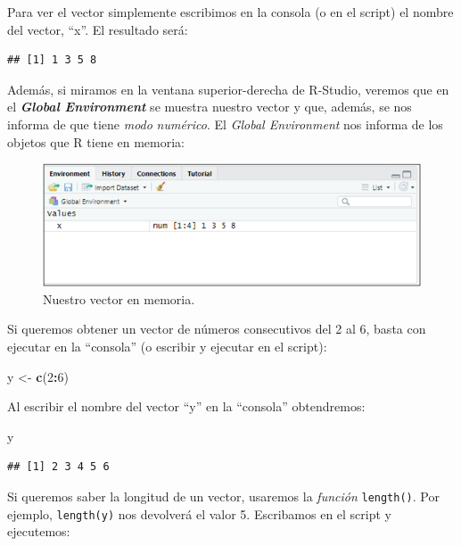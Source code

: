 \documentclass[
]{book}
\newenvironment{Shaded}{\begin{snugshade}}{\end{snugshade}}
\newcommand{\DecValTok}[1]{\textcolor[rgb]{0.00,0.00,0.81}{#1}}
\newcommand{\FunctionTok}[1]{\textcolor[rgb]{0.13,0.29,0.53}{\textbf{#1}}}
\newcommand{\NormalTok}[1]{#1}
\newcommand{\OtherTok}[1]{\textcolor[rgb]{0.56,0.35,0.01}{#1}}
\newcommand{\SpecialCharTok}[1]{\textcolor[rgb]{0.81,0.36,0.00}{\textbf{#1}}}
\let\Oldincludegraphics\includegraphics
\renewcommand{\includegraphics}[2][]{%
  \Oldincludegraphics[#1]{#2}%
}
\begin{document}
Para ver el vector simplemente escribimos en la consola (o en el script) el nombre del vector, ``x''. El resultado será:

\begin{verbatim}
## [1] 1 3 5 8
\end{verbatim}

Además, si miramos en la ventana superior-derecha de R-Studio, veremos que en el \textbf{\emph{Global Environment}} se muestra nuestro vector y que, además, se nos informa de que tiene \emph{modo} \emph{numérico}. El \emph{Global Environment} nos informa de los objetos que R tiene en memoria:

\begin{figure}
\centering
\includegraphics[width=5.20833in,height=\textheight]{figuras/Imagen2_01.png}
\caption{Nuestro vector en memoria.}
\end{figure}

Si queremos obtener un vector de números consecutivos del 2 al 6, basta con ejecutar en la ``consola'' (o escribir y ejecutar en el script):

\begin{Shaded}
\begin{Highlighting}[]
\NormalTok{y }\OtherTok{\textless{}{-}} \FunctionTok{c}\NormalTok{(}\DecValTok{2}\SpecialCharTok{:}\DecValTok{6}\NormalTok{)}
\end{Highlighting}
\end{Shaded}

Al escribir el nombre del vector ``y'' en la ``consola'' obtendremos:

\begin{Shaded}
\begin{Highlighting}[]
\NormalTok{y}
\end{Highlighting}
\end{Shaded}

\begin{verbatim}
## [1] 2 3 4 5 6
\end{verbatim}

Si queremos saber la longitud de un vector, usaremos la \emph{función} \texttt{length()}. Por ejemplo, \texttt{length(y)} nos devolverá el valor 5. Escribamos en el script y ejecutemos:
\end{document}
